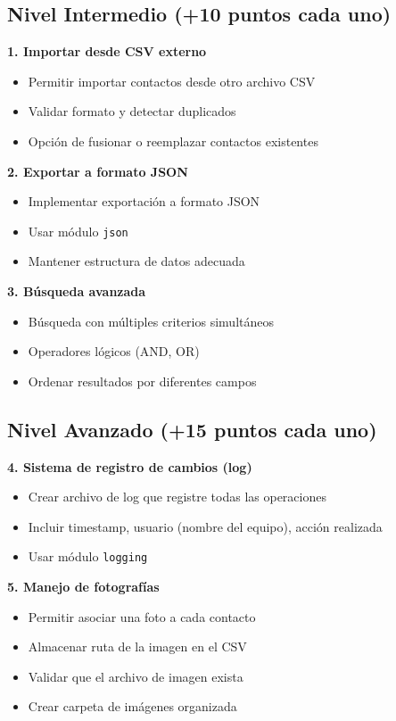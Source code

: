 \documentclass[11pt,letterpaper]{article}
\begin{document}
\subsection{Nivel Intermedio (+10 puntos cada uno)}

\textbf{1. Importar desde CSV externo}
\begin{itemize}
    \item Permitir importar contactos desde otro archivo CSV
    \item Validar formato y detectar duplicados
    \item Opción de fusionar o reemplazar contactos existentes
\end{itemize}

\textbf{2. Exportar a formato JSON}
\begin{itemize}
    \item Implementar exportación a formato JSON
    \item Usar módulo \texttt{json}
    \item Mantener estructura de datos adecuada
\end{itemize}

\textbf{3. Búsqueda avanzada}
\begin{itemize}
    \item Búsqueda con múltiples criterios simultáneos
    \item Operadores lógicos (AND, OR)
    \item Ordenar resultados por diferentes campos
\end{itemize}

\subsection{Nivel Avanzado (+15 puntos cada uno)}

\textbf{4. Sistema de registro de cambios (log)}
\begin{itemize}
    \item Crear archivo de log que registre todas las operaciones
    \item Incluir timestamp, usuario (nombre del equipo), acción realizada
    \item Usar módulo \texttt{logging}
\end{itemize}

\textbf{5. Manejo de fotografías}
\begin{itemize}
    \item Permitir asociar una foto a cada contacto
    \item Almacenar ruta de la imagen en el CSV
    \item Validar que el archivo de imagen exista
    \item Crear carpeta de imágenes organizada
\end{itemize}
\end{document}
